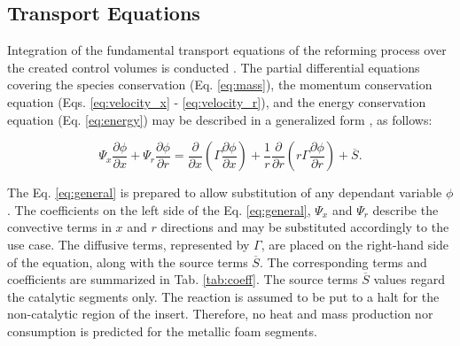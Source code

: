\documentclass[preprint,12pt]{elsarticle}
\begin{document}
\subsection{Transport Equations}
\label{sec:trans_eqs}

Integration of the fundamental transport equations of the reforming process over the created control volumes is conducted \cite{Patankar1980}.  The partial differential equations covering the species conservation (Eq. \eqref{eq:mass}),  the momentum conservation equation (Eqs. \eqref{eq:velocity_x} - \eqref{eq:velocity_r}), and the energy conservation equation (Eq. \eqref{eq:energy}) may be described in a generalized form \cite{Patankar1980}, as follows: 


\begin{equation}
\label{eq:general}
\varPsi_x \dfrac{\partial \phi}{\partial x} + \varPsi_r \dfrac{\partial \phi}{\partial r} = \dfrac{\partial}{\partial x} \left( \varGamma \dfrac{\partial \phi}{\partial x} \right) + \dfrac{1}{r} \dfrac{\partial}{\partial r} \left( r \varGamma \dfrac{\partial \phi}{\partial r} \right) + \overline{S}.
\end{equation}
\hspace{\fill}

The Eq. \eqref{eq:general} is prepared to allow substitution of any dependant variable $\phi$. The coefficients on the left side of the Eq. \eqref{eq:general}, $\varPsi_x$ and $\varPsi_r$ describe the convective terms in $x$ and $r$ directions and may be substituted accordingly to the use case. The diffusive terms, represented by $\varGamma$, are placed on the right-hand side of the equation, along with the source terms $\overline{S}$.  The corresponding terms and coefficients are summarized in Tab. \ref{tab:coeff}. The source terms $\overline{S}$ values regard the catalytic segments only. The reaction is assumed to be put to a halt for the non-catalytic region of the insert. Therefore, no heat and mass production nor consumption is predicted for the metallic foam segments.
 
\end{document}
